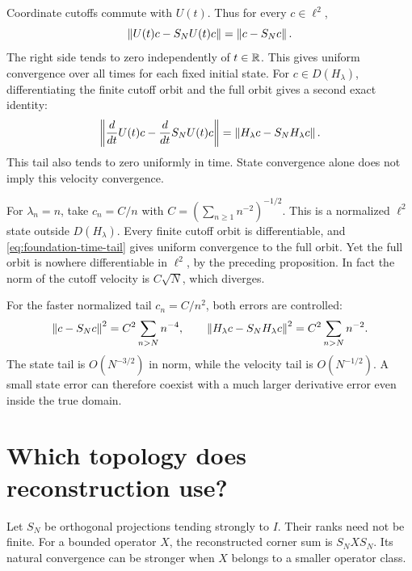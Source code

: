Coordinate cutoffs commute with $U(t)$. Thus for every $c\in\ell^2$,
\begin{equation}
 \left\lVert U(t)c-S_NU(t)c\right\rVert=\left\lVert c-S_Nc\right\rVert.
 \label{eq:foundation-time-tail}
\end{equation}
The right side tends to zero independently of $t\in\mathbb R$. This gives uniform convergence over all times for each fixed initial state. For $c\in D(H_\lambda)$, differentiating the finite cutoff orbit and the full orbit gives a second exact identity:
\begin{equation}
 \left\lVert\frac{d}{dt}U(t)c-
       \frac{d}{dt}S_NU(t)c\right\rVert
 =\left\lVert H_\lambda c-S_NH_\lambda c\right\rVert.
 \label{eq:foundation-velocity-tail}
\end{equation}
This tail also tends to zero uniformly in time. State convergence alone does not imply this velocity convergence.

\begin{example}
For $\lambda_n=n$, take $c_n=C/n$ with $C=(\sum_{n\geq1}n^{-2})^{-1/2}$. This is a normalized $\ell^2$ state outside $D(H_\lambda)$. Every finite cutoff orbit is differentiable, and \eqref{eq:foundation-time-tail} gives uniform convergence to the full orbit. Yet the full orbit is nowhere differentiable in $\ell^2$, by the preceding proposition. In fact the norm of the cutoff velocity is $C\sqrt N$, which diverges.
\end{example}

For the faster normalized tail $c_n=C/n^2$, both errors are controlled:
\[
 \left\lVert c-S_Nc\right\rVert^2=C^2\sum_{n>N}n^{-4},\qquad
 \left\lVert H_\lambda c-S_NH_\lambda c\right\rVert^2=C^2\sum_{n>N}n^{-2}.
\]
The state tail is $O(N^{-3/2})$ in norm, while the velocity tail is $O(N^{-1/2})$. A small state error can therefore coexist with a much larger derivative error even inside the true domain.



\section{Which topology does reconstruction use?}
\label{sec:foundation-reconstruction-topologies}

Let $S_N$ be orthogonal projections tending strongly to $I$. Their ranks need not be finite. For a bounded operator $X$, the reconstructed corner sum is $S_NXS_N$. Its natural convergence can be stronger when $X$ belongs to a smaller operator class.

